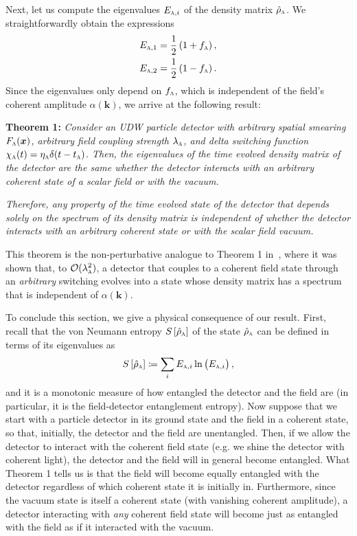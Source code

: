 \documentclass[pra,nofootinbib,floats,aps,twocolumn,tightenlines,superscriptaddress]{revtex4-1}
\newcommand{\rhoa}{\hat{\rho}_\textsc{a}}
\newcommand{\fa}{f_\textsc{a}}
\begin{document}
Next, let us compute the eigenvalues $E_{\textsc{a},i}$ of the density matrix $\rhoa$. We straightforwardly obtain the expressions
\begin{align}
\label{eq:E_A_1}
    E_{\textsc{a},1}
    &=
    \frac{1}{2}
    \left(1+\fa\right),
    \\
\label{eq:E_A_2}
    E_{\textsc{a},2}
    &=
    \frac{1}{2}
    \left(1-\fa\right).
\end{align}
Since the eigenvalues only depend on $f_\textsc{a}$, which is independent of the field's coherent amplitude $\alpha(\bm k)$, we arrive at the following result:

\vspace{2mm}
\textbf{Theorem 1:} 
\textit{Consider an UDW particle detector with arbitrary spatial smearing $F_\textsc{a}(\bm x)$, arbitrary field coupling strength $\lambda_\textsc{a}$, and delta switching function \mbox{$\chi_\textsc{a}(t)=\eta_\textsc{a}\delta(t-t_\textsc{a})$}. Then, the eigenvalues of the time evolved density matrix of the detector are the same whether the detector interacts with an arbitrary coherent state of a scalar field or with the vacuum.}

\textit{Therefore, any property of the time evolved state of the detector that depends solely on the spectrum of its density matrix is independent of whether the detector interacts with an arbitrary coherent state or with the scalar field vacuum.
}
\vspace{2mm}

This theorem is the non-perturbative analogue to Theorem 1 in~\cite{Simidzija2017b}, where it was shown that, to $\mathcal{O}(\lambda_\textsc{a}^2)$, a detector that couples to a coherent field state through an \textit{arbitrary} switching evolves into a state whose density matrix has a spectrum that is independent of $\alpha(\bm k)$.



To conclude this section, we give a physical consequence of our result. First, recall that the von Neumann entropy $S\left[\rhoa\right]$ of the state $\rhoa$ can be defined in terms of its eigenvalues as
\begin{equation}
    S\left[\rhoa\right]
    \coloneqq
    \sum_i 
    E_{\textsc{a},i}
    \ln
    \left(E_{\textsc{a},i}\right),
\end{equation}
and it is a monotonic measure of how entangled the detector and the field are (in particular, it is the field-detector entanglement entropy). Now suppose that we start with a particle detector in its ground state and the field in a coherent state, so that, initially, the detector and the field are unentangled. Then, if we allow the detector to interact with the coherent field state (e.g. we shine the detector with coherent light), the detector and the field will in general become entangled. What Theorem 1 tells us is that the field will become equally entangled with the detector regardless of which coherent state it is initially in. Furthermore, since the vacuum state is itself a coherent state (with vanishing coherent amplitude), a detector interacting with \textit{any} coherent field state will become just as entangled with the field as if it interacted with the vacuum.
\end{document}
